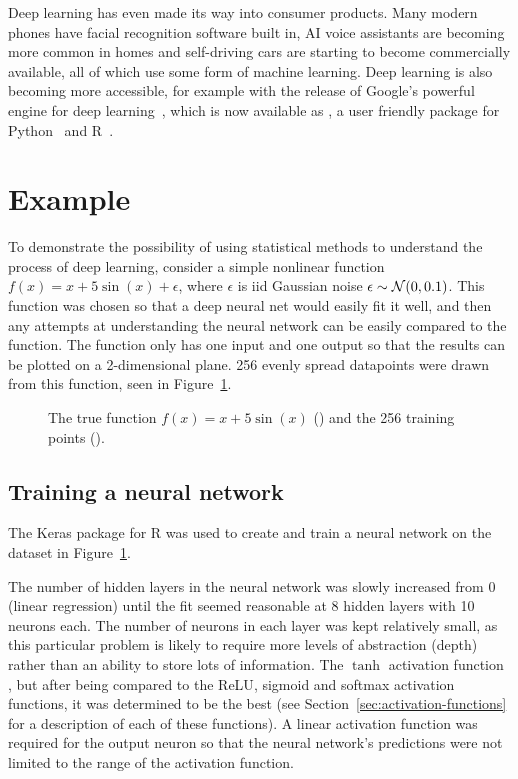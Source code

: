 Deep learning has even made its way into consumer products.
Many modern phones have facial recognition software built in, AI voice assistants are becoming more common in homes and self-driving cars are starting to become commercially available, all of which use some form of machine learning.
Deep learning is also becoming more accessible, for example with the release of Google's powerful  engine for deep learning~\autocite{abadi2016}, which is now available as , a user friendly package for Python~\autocite{chollet2015} and R~\autocite{allaire2018}.

\section{Example}

To demonstrate the possibility of using statistical methods to understand the process of deep learning, consider a simple nonlinear function \(f(x) = x + 5 \sin(x) + \epsilon\), where \(\epsilon\) is iid Gaussian noise \(\epsilon \sim \mathcal{N}(0, 0.1)\).
This function was chosen so that a deep neural net would easily fit it well, and then any attempts at understanding the neural network can be easily compared to the  function.
The function only has one input and one output so that the results can be plotted on a 2-dimensional plane.
256 evenly spread datapoints were drawn from this function, seen in Figure~\ref{fig:sin-x-dataset}.

\begin{figure}[htbp]
	\centering
	
	\caption{The true function \(f(x) = x + 5 \sin(x)\) (\truthcolour) and the 256 training points (\traincolour).}
	\label{fig:sin-x-dataset}
\end{figure}

\subsection{Training a neural network}

The Keras package for R \autocite{allaire2018} was used to create and train a neural network on the dataset in Figure~\ref{fig:sin-x-dataset}.

The number of hidden layers in the neural network was slowly increased from 0 (linear regression) until the fit seemed reasonable at 8 hidden layers with 10 neurons each.
The number of neurons in each layer was kept relatively small, as this particular problem is likely to require more levels of abstraction (depth) rather than an ability to store lots of information.
The \(\tanh\) activation function , but after being compared to the \ac{ReLU}, sigmoid and softmax activation functions, it was determined to be the best (see Section~\ref{sec:activation-functions} for a description of each of these functions).
A linear activation function was required for the output neuron so that the neural network's predictions were not limited to the range of the activation function.


